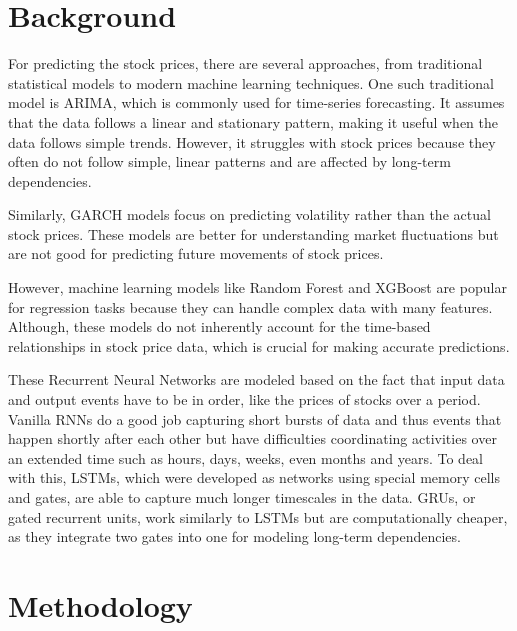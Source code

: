 \documentclass[10pt,twocolumn,a4paper]{article}
\begin{document}
\section{Background}
For predicting the stock prices, there are several approaches, from traditional statistical models to modern machine learning techniques. One such traditional model is ARIMA, which is commonly used for time-series forecasting. It assumes that the data follows a linear and stationary pattern, making it useful when the data follows simple trends. However, it struggles with stock prices because they often do not follow simple, linear patterns and are affected by long-term dependencies.

Similarly, GARCH models focus on predicting volatility rather than the actual stock prices. These models are better for understanding market fluctuations but are not good for predicting future movements of stock prices.

However, machine learning models like Random Forest and XGBoost are popular for regression tasks because they can handle complex data with many features. Although, these models do not inherently account for the time-based relationships in stock price data, which is crucial for making accurate predictions.

These Recurrent Neural Networks are modeled based on the fact that input data and output events have to be in order, like the prices of stocks over a period. Vanilla RNNs do a good job capturing short bursts of data and thus events that happen shortly after each other but have difficulties coordinating activities over an extended time such as hours, days, weeks, even months and years. To deal with this, LSTMs, which were developed as networks using special memory cells and gates, are able to capture much longer timescales in the data. GRUs, or gated recurrent units, work similarly to LSTMs but are computationally cheaper, as they integrate two gates into one for modeling long-term dependencies.

\section{Methodology}
\end{document}
